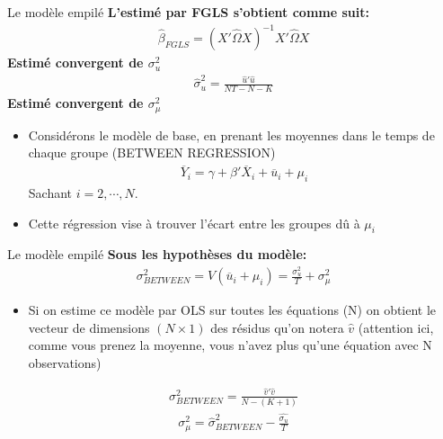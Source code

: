 \documentclass{beamer}
\begin{document}
\begin{frame}{Le modèle empilé}
\textbf{L'estimé par FGLS s’obtient comme suit:}
\begin{align*}
\hat{\beta}_{FGLS}=(X'\hat{\Omega}X)^{-1}X'\hat{\Omega}X
\end{align*}
\textbf{Estimé convergent de $\sigma_u^2$}
\begin{align*}
\hat{\sigma}_u^2=\frac{\hat{u}'\hat{u}}{NT-N-K}
\end{align*}
\textbf{Estimé convergent de $\sigma_{\mu}^2$}
\begin{itemize}
\item Considérons le modèle de base, en prenant les moyennes dans le temps de chaque groupe (BETWEEN REGRESSION)
\begin{align*}
\overline{Y}_i=\gamma+\beta'\overline{X}_i+\overline{u}_i+\mu_i
\end{align*}
Sachant $i=2, \cdots, N.$
\item Cette régression vise à trouver l’écart entre les groupes dû à $\mu_i$
\end{itemize}
\end{frame}



\begin{frame}{Le modèle empilé}
\textbf{Sous les hypothèses du modèle:}
\begin{align*}
\sigma_{BETWEEN}^2=V(\overline{u}_i+\mu_i)=\frac{\sigma_u^2}{T}+\sigma_\mu^2
\end{align*}
\begin{itemize}
\item Si on estime ce modèle par OLS sur toutes les équations (N) on obtient le vecteur de dimensions $(N \times 1)$ des résidus qu’on notera $\hat{v}$ (attention ici, comme vous prenez la moyenne, vous n’avez plus qu’une équation avec N observations)
\end{itemize}
\begin{align*}
\sigma_{BETWEEN}^2=\frac{\hat{v}'\hat{v}}{N-(K+1)}
\end{align*}
\begin{align*}
\sigma_{\mu}^2=\hat{\sigma}_{BETWEEN}^2 -\frac{\hat{\sigma_u}}{T}
\end{align*}
\end{frame}
\end{document}

